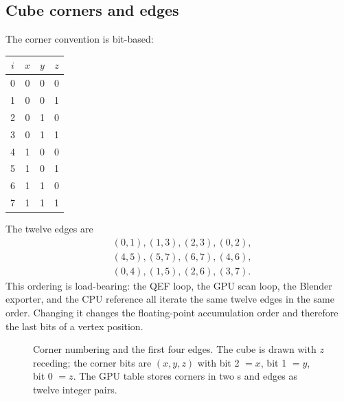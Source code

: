 \subsection{Cube corners and edges}

The corner convention is bit-based:
\begin{center}
\begin{tabular}{@{}c|ccc@{}}
\toprule
$i$ & $x$ & $y$ & $z$\\
\midrule
0 & 0 & 0 & 0\\
1 & 0 & 0 & 1\\
2 & 0 & 1 & 0\\
3 & 0 & 1 & 1\\
4 & 1 & 0 & 0\\
5 & 1 & 0 & 1\\
6 & 1 & 1 & 0\\
7 & 1 & 1 & 1\\
\bottomrule
\end{tabular}
\end{center}
The twelve edges are
\begin{equation}
\begin{aligned}
&(0,1),(1,3),(2,3),(0,2),\\
&(4,5),(5,7),(6,7),(4,6),\\
&(0,4),(1,5),(2,6),(3,7).
\end{aligned}
\label{eq:edges}
\end{equation}
This ordering is load-bearing: the QEF loop, the GPU scan loop, the
Blender exporter, and the CPU reference all iterate the same twelve edges
in the same order.  Changing it changes the floating-point accumulation
order and therefore the last bits of a vertex position.

\begin{figure}[htbp]
\centering
{}
\caption{Corner numbering and the first four edges.  The cube is drawn with
$z$ receding; the corner bits are $(x,y,z)$ with bit 2 $=x$, bit 1 $=y$,
bit 0 $=z$.  The GPU table stores corners in two s and edges as
twelve integer pairs.}
\label{fig:corners}
\end{figure}

